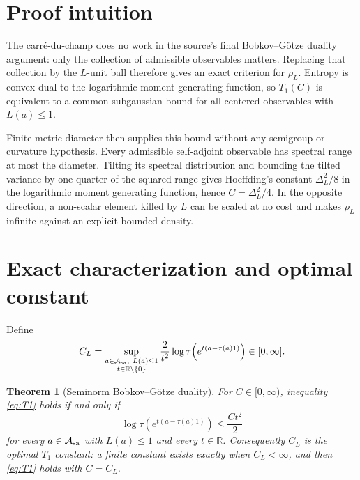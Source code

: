 \documentclass[11pt]{article}
\newtheorem{theorem}{Theorem}
\begin{document}
\section*{Proof intuition}

The carré-du-champ does no work in the source's final Bobkov--G\"otze
duality argument: only the collection of admissible observables matters.
Replacing that collection by the $L$-unit ball therefore gives an exact
criterion for $\rho_L$.  Entropy is convex-dual to the logarithmic moment
generating function, so $T_1(C)$ is equivalent to a common subgaussian bound
for all centered observables with $L(a)\leq1$.

Finite metric diameter then supplies this bound without any semigroup or
curvature hypothesis.  Every admissible self-adjoint observable has spectral
range at most the diameter.  Tilting its spectral distribution and bounding
the tilted variance by one quarter of the squared range gives Hoeffding's
constant $\Delta_L^2/8$ in the logarithmic moment generating function, hence
$C=\Delta_L^2/4$.  In the opposite direction, a non-scalar element killed by
$L$ can be scaled at no cost and makes $\rho_L$ infinite against an explicit
bounded density.

\section*{Exact characterization and optimal constant}

Define
\begin{equation}\label{eq:CL}
 C_L=\sup_{\substack{a\in\mathcal A_{\rm sa},\ L(a)\leq1\\ t\in\mathbb R\setminus\{0\}}}
 \frac{2}{t^2}\log\tau\!\left(
  e^{t(a-\tau(a)1)}\right)\in[0,\infty].
\end{equation}

\begin{theorem}[Seminorm Bobkov--G\"otze duality]\label{thm:duality}
For $C\in[0,\infty)$, inequality \eqref{eq:T1} holds if and only if
\begin{equation}\label{eq:mgf}
 \log\tau\!\left(e^{t(a-\tau(a)1)}\right)\leq\frac{Ct^2}{2}
\end{equation}
for every $a\in\mathcal A_{\rm sa}$ with $L(a)\leq1$ and every
$t\in\mathbb R$.  Consequently $C_L$ is the optimal $T_1$ constant: a finite
constant exists exactly when $C_L<\infty$, and then \eqref{eq:T1} holds with
$C=C_L$.
\end{theorem}
\end{document}
